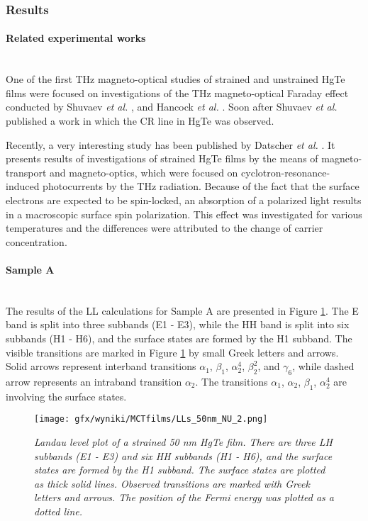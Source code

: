 \documentclass[titlepage,a4paper]{book}
\newcommand{\wciecie}{\quad\phantom{v}}
\newcommand{\myparagraph}[1]{\paragraph{#1}\mbox{}\\}
\begin{document}
\subsubsection{Results}
\myparagraph{Related experimental works}
\wciecie
One of the first THz magneto-optical studies of strained and unstrained HgTe films were focused on investigations of the THz magneto-optical Faraday effect conducted by Shuvaev \textit{et al.} \cite{Shuvaev_MCT_films2}\cite{Shuvaev_MCT_films3}, and Hancock \textit{et al.} \cite{Hancock_MCT_films}. Soon after Shuvaev \textit{et al.} \cite{Shuvaev_MCT_films1} published a work in which the CR line in HgTe was observed. 

Recently, a very interesting study has been published by Datscher \textit{et al.} \cite{Ganichev_MCT_layers}. It presents results of investigations of strained HgTe films by the means of magneto-transport and magneto-optics, which were focused on cyclotron-resonance-induced photocurrents by the THz radiation. Because of the fact that the surface electrons are expected to be spin-locked, an absorption of a polarized light results in a macroscopic surface spin polarization. This effect was investigated for various temperatures and the differences were attributed to the change of carrier concentration.


\clearpage
\myparagraph{Sample A}
\wciecie
The results of the LL calculations for Sample A are presented in Figure \ref{fig:LL_50nm_2}. The E band is split into three subbands (E1 - E3), while the HH band is split into six subbands (H1 - H6), and the surface states are formed by the H1 subband. The visible transitions are marked in Figure \ref{fig:LL_50nm_2} by small Greek letters and arrows. Solid arrows represent interband transitions $\alpha_1$, $\beta_1$, $\alpha_2^{4}$, $\beta_2^{2}$, and $\gamma_6$, while dashed arrow represents an intraband transition $\alpha_2$. The transitions $\alpha_1$, $\alpha_2$, $\beta_1$, $\alpha_2^{4}$ are involving the surface states.

\begin{figure}[H]
	\centering
	\texttt{[image: gfx/wyniki/MCTfilms/LLs\_50nm\_NU\_2.png]}
	\vspace{-10pt}
	\caption{\textit{Landau level plot of a strained 50 nm HgTe film. There are three LH subbands (E1 - E3) and six HH subbands (H1 - H6), and the surface states are formed by the H1 subband. The surface states are plotted as thick solid lines. Observed transitions are marked with Greek letters and arrows. The position of the Fermi energy was plotted as a dotted line.}}
	\label{fig:LL_50nm_2}
\end{figure} 
\end{document}
